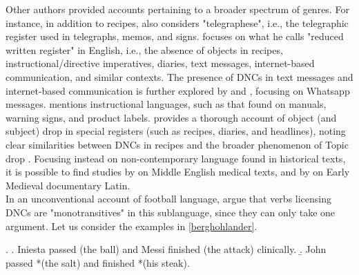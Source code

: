 Other authors provided accounts pertaining to a broader spectrum of genres. For instance, in addition to recipes, \textcite{Cote1996} also considers "telegraphese", i.e., the telegraphic register used in telegraphs, memos, and signs. \textcite{Weir2017} focuses on what he calls "reduced written register" in English, i.e., the absence of objects in recipes, instructional/directive imperatives, diaries, text messages, internet-based communication, and similar contexts. The presence of DNCs in text messages and internet-based communication is further explored by \textcite{StarkMeier2017} and \textcite{Stuntebeck2018}, focusing on Whatsapp messages. \textcite[304]{Liu2008} mentions instructional languages, such as that found on manuals, warning signs, and product labels. \textcite{Paesani2006} provides a thorough account of object (and subject) drop in special registers (such as recipes, diaries, and headlines), noting clear similarities between DNCs in recipes and the broader phenomenon of Topic drop \parencite[165]{Paesani2006}. Focusing instead on non-contemporary language found in historical texts, it is possible to find studies by \textcite{Almeida2009} on Middle English medical texts, and by \textcite{Korkiakangas2018} on Early Medieval documentary Latin.\\
In an unconventional account of football language, \textcite{BerghOhlander2016} argue that verbs licensing DNCs are "monotransitives" \parencite[54]{quirk1985grammar} in this sublanguage, since they can only take one argument. Let us consider the examples in \ref{berghohlander}.

\ex. \label{berghohlander} \a. \label{berghohlander1} Iniesta passed (the ball) and Messi finished (the attack) clinically.
\b. \label{berghohlander2} John passed *(the salt) and finished *(his steak).

